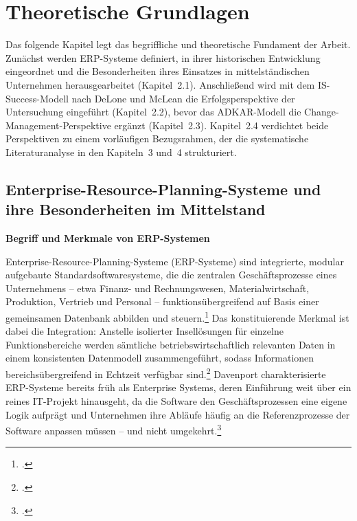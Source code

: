 \section{Theoretische Grundlagen}

Das folgende Kapitel legt das begriffliche und theoretische Fundament der Arbeit. Zun\"achst werden ERP-Systeme definiert, in ihrer historischen Entwicklung eingeordnet und die Besonderheiten ihres Einsatzes in mittelst\"andischen Unternehmen herausgearbeitet (Kapitel~2.1). Anschlie\ss{}end wird mit dem IS-Success-Modell nach DeLone und McLean die Erfolgsperspektive der Untersuchung eingef\"uhrt (Kapitel~2.2), bevor das ADKAR-Modell die Change-Management-Perspektive erg\"anzt (Kapitel~2.3). Kapitel~2.4 verdichtet beide Perspektiven zu einem vorl\"aufigen Bezugsrahmen, der die systematische Literaturanalyse in den Kapiteln~3 und~4 strukturiert.

\subsection{Enterprise-Resource-Planning-Systeme und ihre Besonderheiten im Mittelstand}

\textbf{Begriff und Merkmale von ERP-Systemen}

Enterprise-Resource-Planning-Systeme (ERP-Systeme) sind integrierte, modular aufgebaute Standardsoftwaresysteme, die die zentralen Gesch\"aftsprozesse eines Unternehmens -- etwa Finanz- und Rechnungswesen, Materialwirtschaft, Produktion, Vertrieb und Personal -- funktions\"ubergreifend auf Basis einer gemeinsamen Datenbank abbilden und steuern.\footcite[Vgl.][S.~4--6]{gronau2014} Das konstituierende Merkmal ist dabei die Integration: Anstelle isolierter Insell\"osungen f\"ur einzelne Funktionsbereiche werden s\"amtliche betriebswirtschaftlich relevanten Daten in einem konsistenten Datenmodell zusammengef\"uhrt, sodass Informationen bereichs\"ubergreifend in Echtzeit verf\"ugbar sind.\footcite[Vgl.][S.~141--143]{klaus2000} Davenport charakterisierte ERP-Systeme bereits fr\"uh als Enterprise Systems, deren Einf\"uhrung weit \"uber ein reines IT-Projekt hinausgeht, da die Software den Gesch\"aftsprozessen eine eigene Logik aufpr\"agt und Unternehmen ihre Abl\"aufe h\"aufig an die Referenzprozesse der Software anpassen m\"ussen -- und nicht umgekehrt.\footcite[Vgl.][S.~121--124]{davenport1998}

